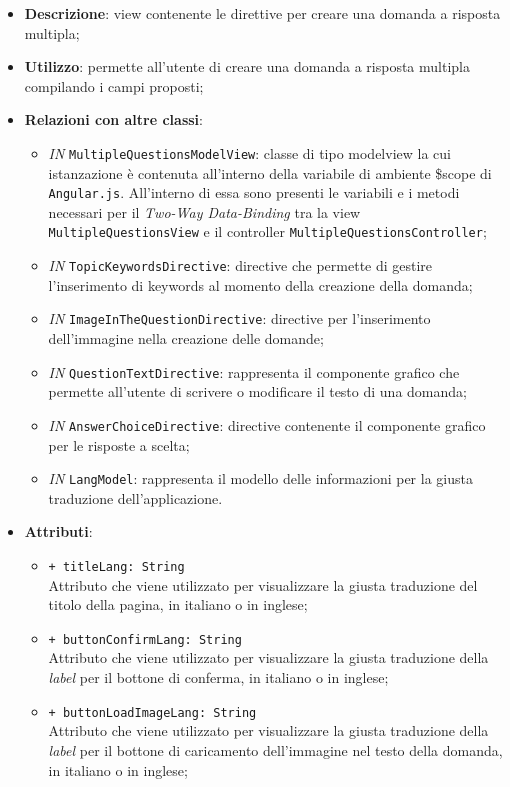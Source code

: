 \begin{itemize}
	\item \textbf{Descrizione}: view contenente le direttive per creare una domanda a risposta multipla;
	\item \textbf{Utilizzo}: permette all'utente di creare una domanda a risposta multipla compilando i campi proposti;
	\item \textbf{Relazioni con altre classi}:
		\begin{itemize}
			\item \textit{IN} \texttt{MultipleQuestionsModelView}: classe di tipo modelview la cui istanzazione è contenuta all'interno della variabile di ambiente \$scope di \texttt{Angular.js}. All'interno di essa sono presenti le variabili e i metodi necessari per il \textit{Two-Way Data-Binding} tra la view \texttt{MultipleQuestionsView} e il controller \texttt{MultipleQuestionsController};
			\item \textit{IN} \texttt{TopicKeywordsDirective}: directive che permette di gestire l'inserimento di keywords al momento della creazione della domanda;
			\item \textit{IN} \texttt{ImageInTheQuestionDirective}: directive per l'inserimento dell'immagine nella creazione delle domande;
			\item \textit{IN} \texttt{QuestionTextDirective}: rappresenta il componente grafico che permette all'utente di scrivere o modificare il testo di una domanda;
			\item \textit{IN} \texttt{AnswerChoiceDirective}: directive contenente il componente grafico per le risposte a scelta;
			\item \textit{IN} \texttt{LangModel}: rappresenta il modello delle informazioni per la giusta traduzione dell'applicazione.
		\end{itemize}
	\item \textbf{Attributi}:
	\begin{itemize}
		\item \texttt{+ titleLang: String} \\ Attributo che viene utilizzato per visualizzare la giusta traduzione del titolo della pagina, in italiano o in inglese;
		\item \texttt{+ buttonConfirmLang: String} \\ Attributo che viene utilizzato per visualizzare la giusta traduzione della \textit{label} per il bottone di conferma, in italiano o in inglese;
		\item \texttt{+ buttonLoadImageLang: String} \\ Attributo che viene utilizzato per visualizzare la giusta traduzione della \textit{label} per il bottone di caricamento dell'immagine nel testo della domanda, in italiano o in inglese;

\end{itemize}
\end{itemize}

